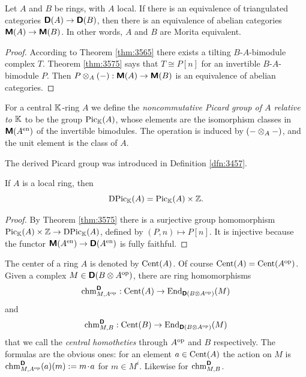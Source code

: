 \begin{cor} \label{cor:3580}
Let $A$ and $B$ be rings, with $A$ local.
If there is an equivalence of triangulated categories
$\boldsymbol{\mathsf{D}}(A) \to \boldsymbol{\mathsf{D}}(B)$, then there is an equivalence of 
abelian categories $\boldsymbol{\mathsf{M}}(A) \to \boldsymbol{\mathsf{M}}(B)$. In other words, $A$ and $B$ 
are Morita equivalent. 
\end{cor}

\begin{proof}
According to Theorem \ref{thm:3565} there exists a tilting $B$-$A$-bimodule 
complex $T$. Theorem \ref{thm:3575} says that $T \cong P[n]$ for an invertible 
$B$-$A$-bimodule $P$. Then 
$P \otimes_A (-) : \boldsymbol{\mathsf{M}}(A) \to \boldsymbol{\mathsf{M}}(B)$
is an equivalence of abelian categories. 
\end{proof}

\begin{dfn} \label{dfn:3590}
For a central $\mathbb{K}$-ring $A$ we define the 
{\em noncommutative Picard group of $A$ relative to $\mathbb{K}$}
to be the group $\operatorname{Pic}_{\mathbb{K}}(A)$, whose elements are 
the isomorphism classes in $\boldsymbol{\mathsf{M}}(A^{\mathrm{en}})$ of the invertible 
bimodules. The operation is induced by $(- \otimes_A -)$, and the unit element is 
the class of $A$. 
\end{dfn}

The derived Picard group was introduced in Definition \ref{dfn:3457}.

\begin{cor} \label{cor:3590}
If $A$ is a local ring, then 
\[ \operatorname{DPic}_{\mathbb{K}}(A) = \operatorname{Pic}_{\mathbb{K}}(A) \times \mathbb{Z} . \]
\end{cor}

\begin{proof}
By Theorem \ref{thm:3575} there is a surjective group homomorphism 
$\operatorname{Pic}_{\mathbb{K}}(A) \times \mathbb{Z} \to  \operatorname{DPic}_{\mathbb{K}}(A)$,
defined by $(P, n) \mapsto P[n]$.
It is injective because the functor 
$\boldsymbol{\mathsf{M}}(A^{\mathrm{en}}) \to \boldsymbol{\mathsf{D}}(A^{\mathrm{en}})$
is fully faithful. 
\end{proof}

The center of a ring $A$ is denoted by $\operatorname{Cent}(A)$. Of course 
$\operatorname{Cent}(A) = \operatorname{Cent}(A^{\mathrm{op}})$. 
Given a complex $M \in  \boldsymbol{\mathsf{D}}(B \otimes A^{\mathrm{op}})$, 
there are ring homomorphisms 
\begin{equation} \label{eqn:3580}
\operatorname{chm}^{\boldsymbol{\mathsf{D}}}_{M, A^{\mathrm{op}}} : \operatorname{Cent}(A) \to 
\operatorname{End}_{\boldsymbol{\mathsf{D}}(B \otimes A^{\mathrm{op}})}(M)
\end{equation}
and 
\begin{equation} \label{eqn:3581}
\operatorname{chm}^{\boldsymbol{\mathsf{D}}}_{M, B} : \operatorname{Cent}(B) \to 
\operatorname{End}_{\boldsymbol{\mathsf{D}}(B \otimes A^{\mathrm{op}})}(M) 
\end{equation}
that we call the {\em central homotheties} through $A^{\mathrm{op}}$ and $B$
respectively. The formulas are the obvious ones: for an element 
$a \in \operatorname{Cent}(A)$ the action on $M$ is 
$\operatorname{chm}^{\boldsymbol{\mathsf{D}}}_{M, A^{\mathrm{op}}}(a)(m) := m \mspace{1.5mu}{\cdot}\mspace{1.5mu} a$ 
for $m \in M^i$. Likewise for $\operatorname{chm}^{\boldsymbol{\mathsf{D}}}_{M, B}$. 

